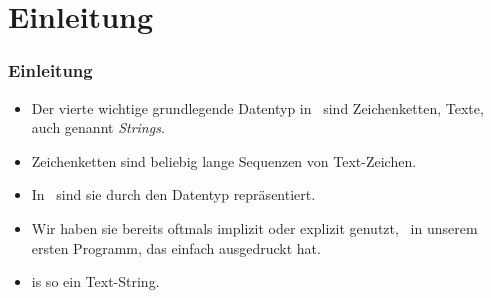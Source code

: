 \documentclass[aspectratio=169,mathserif,notheorems]{beamer}%
\subtitle{11.~Der Datentyp str}%
\begin{document}
%
%
\startPresentation%
%
\section{Einleitung}%
\begin{frame}%
\frametitle{Einleitung}%
\begin{itemize}%
\item Der vierte wichtige grundlegende Datentyp in \python\ sind Zeichenketten, Texte, auch genannt \emph{Strings}.%
\item<2-> Zeichenketten sind beliebig lange Sequenzen von Text-Zeichen.%
\item<3-> In \python\ sind sie durch den Datentyp  repräsentiert.%
\item<4-> Wir haben sie bereits oftmals implizit oder explizit genutzt, \DEzB\ in unserem ersten Programm, das einfach  ausgedruckt hat.%
\item<5->  is so ein Text-String.%
\end{itemize}%
\end{frame}%
%
%
\end{document}
